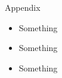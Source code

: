 
\begin{frame}{Appendix}
	\begin{itemize}
		\item Something
		\item Something
		\item Something
	\end{itemize}

\end{frame}
